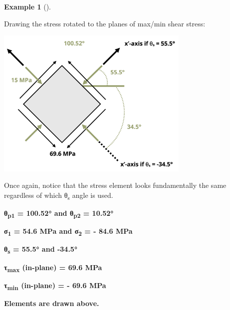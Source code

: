 \documentclass[
  letterpaper,
  DIV=11,
  numbers=noendperiod]{scrreprt}
\theoremstyle{definition}
\newtheorem{example}{Example}[chapter]
\theoremstyle{remark}
\begin{document}
\begin{tcolorbox}
\begin{example}[]
\begin{tcolorbox}
Drawing the stress rotated to the planes of max/min shear stress:

\begin{center}
\includegraphics[width=3.64583in,height=\textheight]{images/CH12 figures/example 12.3 part 3.png}
\end{center}

Once again, notice that the stress element looks fundamentally the same
regardless of which θ\textsubscript{s} angle is used.

\textbf{θ\textsubscript{p1} = 100.52° and θ\textsubscript{p2} = 10.52°}

\textbf{σ\textsubscript{1} = 54.6 MPa and σ\textsubscript{2} = - 84.6
MPa}

\textbf{θ\textsubscript{s} = 55.5° and -34.5°}

\textbf{τ\textsubscript{max} (in-plane) = 69.6 MPa}

\textbf{τ\textsubscript{min} (in-plane) = - 69.6 MPa}

\textbf{Elements are drawn above.}

\end{tcolorbox}

\end{example}

\end{tcolorbox}
\end{document}
